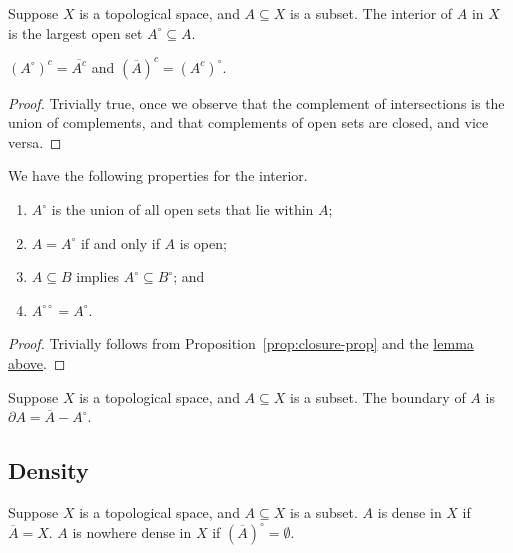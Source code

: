 \begin{definition}
    Suppose \(X\) is a topological space, and \(A \subseteq X\) is a subset.
    The interior of \(A\) in \(X\) is the largest open set \(A^\circ \subseteq A\).
\end{definition}
\begin{lemma}\label{lem:closure-interior}
    \({(A^\circ)}^c = \overline{A^c}\) and \({(\overline{A})}^c = {(A^c)}^\circ\).
\end{lemma}
\begin{proof}
    Trivially true, once we observe that the complement of intersections is the union of complements,
    and that complements of open sets are closed, and vice versa.
\end{proof}
\begin{proposition}
    We have the following properties for the interior.
    \begin{enumerate}[label={(\alph*)}, itemsep=0mm]
        \item \(A^\circ\) is the union of all open sets that lie within \(A\);
        \item \(A = A^\circ\) if and only if \(A\) is open;
        \item \(A \subseteq B\) implies \(A^\circ \subseteq B^\circ\); and
        \item \(A^{\circ\circ} = A^\circ\).
    \end{enumerate}
\end{proposition}
\begin{proof}
    Trivially follows from Proposition~\ref{prop:closure-prop} and the \hyperref[lem:closure-interior]{lemma above}.
\end{proof}

\begin{definition}
    Suppose \(X\) is a topological space, and \(A \subseteq X\) is a subset.
    The boundary of \(A\) is \(\partial A = \overline{A}-A^\circ\).
\end{definition}

\subsection*{Density}

\begin{definition}
    Suppose \(X\) is a topological space, and \(A \subseteq X\) is a subset.
    \(A\) is dense in \(X\) if \(\overline{A} = X\).
    \(A\) is nowhere dense in \(X\) if \({(\overline{A})}^\circ = \emptyset\).
\end{definition}

